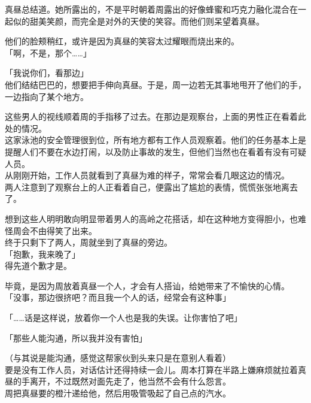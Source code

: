 真昼总结道。她所露出的，不是平时朝着周露出的好像蜂蜜和巧克力融化混合在一起似的甜美笑颜，而完全是对外的天使的笑容。而他们则呆望着真昼。

他们的脸颊稍红，或许是因为真昼的笑容太过耀眼而烧出来的。\\

「啊，不是，那个……」

「我说你们，看那边」\\

他们结结巴巴的，想要把手伸向真昼。于是，周一边若无其事地甩开了他们的手，一边指向了某个地方。

这些男人的视线顺着周的手指移了过去。在那边是观察台，上面的男性正在看着此处的情况。\\

这家泳池的安全管理很到位，所有地方都有工作人员观察着。他们的任务基本上是提醒人们不要在水边打闹，以及防止事故的发生，但他们当然也在看着有没有可疑人员。\\

从刚刚开始，工作人员就看到了真昼为难的样子，常常会看几眼这边的情况。\\

两人注意到了观察台上的人正看着自己，便露出了尴尬的表情，慌慌张张地离去了。

想到这些人明明敢向明显带着男人的高岭之花搭话，却在这种地方变得胆小，也难怪周会不由得笑了出来。\\

终于只剩下了两人，周就坐到了真昼的旁边。\\

「抱歉，我来晚了」\\

得先道个歉才是。

毕竟，是因为周放着真昼一个人，才会有人搭讪，给她带来了不愉快的心情。\\

「没事，那边很挤吧？而且我一个人的话，经常会有这种事」

「……话是这样说，放着你一个人也是我的失误。让你害怕了吧」

「那些人能沟通，所以我并没有害怕」

（与其说是能沟通，感觉这帮家伙到头来只是在意别人看着）\\

要是没有工作人员，对话估计还得持续一会儿。周本打算在半路上嫌麻烦就拉着真昼的手离开，不过既然对面先走了，他当然不会有什么怨言。\\

周把真昼要的橙汁递给他，然后用吸管吸起了自己点的汽水。\\

